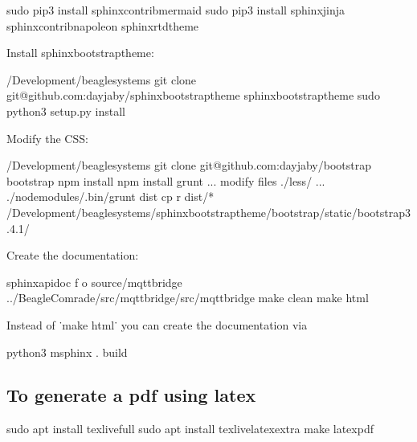 \documentclass[letterpaper,10pt,english]{sphinxmanual}
\begin{document}
\begin{sphinxVerbatim}[commandchars=\\\{\}]
sudo pip3 install sphinxcontrib\PYGZhy{}mermaid
sudo pip3 install sphinx\PYGZhy{}jinja sphinxcontrib\PYGZhy{}napoleon sphinx\PYGZhy{}rtd\PYGZhy{}theme
\end{sphinxVerbatim}

Install sphinx\sphinxhyphen{}bootstrap\sphinxhyphen{}theme:

\begin{sphinxVerbatim}[commandchars=\\\{\}]
 \PYGZti{}/Development/beaglesystems
git clone git@github.com:dayjaby/sphinx\PYGZhy{}bootstrap\PYGZhy{}theme
 sphinx\PYGZhy{}bootstrap\PYGZhy{}theme
sudo python3 setup.py install
\end{sphinxVerbatim}

Modify the CSS:

\begin{sphinxVerbatim}[commandchars=\\\{\}]
 \PYGZti{}/Development/beaglesystems
git clone git@github.com:dayjaby/bootstrap
 bootstrap
npm install
npm install grunt
... modify files  ./less/ ...
./node\PYGZus{}modules/.bin/grunt dist
cp \PYGZhy{}r dist/* \PYGZti{}/Development/beaglesystems/sphinx\PYGZhy{}bootstrap\PYGZhy{}theme/bootstrap/static/bootstrap\PYGZhy{}3.4.1/
\end{sphinxVerbatim}

Create the documentation:

\begin{sphinxVerbatim}[commandchars=\\\{\}]
sphinx\PYGZhy{}apidoc \PYGZhy{}f \PYGZhy{}o source/mqtt\PYGZus{}bridge ../BeagleComrade/src/mqtt\PYGZus{}bridge/src/mqtt\PYGZus{}bridge
make clean  make html
\end{sphinxVerbatim}

Instead of ˙make html˙ you can create the documentation via

\begin{sphinxVerbatim}[commandchars=\\\{\}]
python3 \PYGZhy{}msphinx . \PYGZus{}build
\end{sphinxVerbatim}


\subsection{To generate a pdf using latex}
\label{\detokenize{source/howtos/compile_documentation:to-generate-a-pdf-using-latex}}
\begin{sphinxVerbatim}[commandchars=\\\{\}]
sudo apt install texlive\PYGZhy{}full
sudo apt install texlive\PYGZhy{}latex\PYGZhy{}extra
make latexpdf
\end{sphinxVerbatim}
\end{document}
